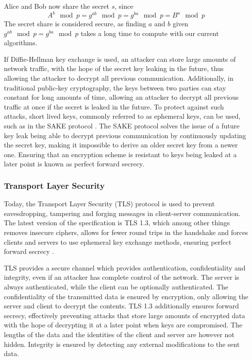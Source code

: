 Alice and Bob now share the secret $s$, since \[A^b \mod p = g^{ab} \mod p = g^{ba} \mod p = B^a \mod p\]
The secret share is considered secure, as finding $a$ and $b$ given $g^{ab} \mod p = g^{ba} \mod p$ takes a long time to compute with our current algorithms.

If Diffie-Hellman key exchange is used, an attacker can store large amounts of network traffic, with the hope of the secret key leaking in the future, thus allowing the attacker to decrypt all previous communication.
Additionally, in traditional public-key cryptography, the keys between two parties can stay constant for long amounts of time, allowing an attacker to decrypt all previous traffic at once if the secret is leaked in the future.
To protect against such attacks, short lived keys, commonly referred to as ephemeral keys, can be used, such as in the SAKE protocol \citep{jarecki_symmetric-key_2020}.
The SAKE protocol solves the issue of a future key leak being able to decrypt previous communication by continuously updating the secret key, making it impossible to derive an older secret key from a newer one.
Ensuring that an encryption scheme is resistant to keys being leaked at a later point is known as perfect forward secrecy.

\subsubsection{Transport Layer Security}
Today, the Transport Layer Security (TLS) protocol is used to prevent eavesdropping, tampering and forging messages in client-server communication. The latest version of the specification is TLS 1.3, which among other things removes insecure ciphers, allows for fewer round trips in the handshake and forces clients and servers to use ephemeral key exchange methods, ensuring perfect forward secrecy \citep{dowling_cryptographic_2015}. 

TLS provides a secure channel which provides authentication, confidentiality and integrity, even if an attacker has complete control of the network. The server is always authenticated, while the client can be optionally authenticated. The confidentiality of the transmitted data is ensured by encryption, only allowing the server and client to decrypt the contents. TLS 1.3 additionally ensures forward secrecy, effectively preventing attacks that store large amounts of encrypted data with the hope of decrypting it at a later point when keys are compromised. The lengths of the data and the identities of the client and server are however not hidden. Integrity is ensured by detecting any external modifications to the sent data.

